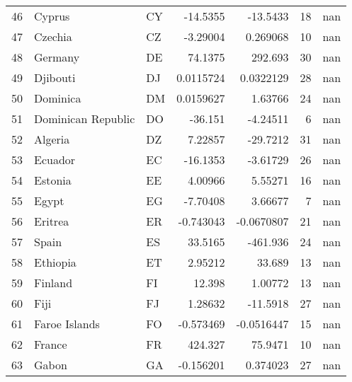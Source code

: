 \begin{tabular}{rllrrrr}
 46 & Cyprus                           & CY         &  -14.5355     &   -13.5433    &     18 &          nan \\
 47 & Czechia                          & CZ         &   -3.29004    &     0.269068  &     10 &          nan \\
 48 & Germany                          & DE         &   74.1375     &   292.693     &     30 &          nan \\
 49 & Djibouti                         & DJ         &    0.0115724  &     0.0322129 &     28 &          nan \\
 50 & Dominica                         & DM         &    0.0159627  &     1.63766   &     24 &          nan \\
 51 & Dominican Republic               & DO         &  -36.151      &    -4.24511   &      6 &          nan \\
 52 & Algeria                          & DZ         &    7.22857    &   -29.7212    &     31 &          nan \\
 53 & Ecuador                          & EC         &  -16.1353     &    -3.61729   &     26 &          nan \\
 54 & Estonia                          & EE         &    4.00966    &     5.55271   &     16 &          nan \\
 55 & Egypt                            & EG         &   -7.70408    &     3.66677   &      7 &          nan \\
 56 & Eritrea                          & ER         &   -0.743043   &    -0.0670807 &     21 &          nan \\
 57 & Spain                            & ES         &   33.5165     &  -461.936     &     24 &          nan \\
 58 & Ethiopia                         & ET         &    2.95212    &    33.689     &     13 &          nan \\
 59 & Finland                          & FI         &   12.398      &     1.00772   &     13 &          nan \\
 60 & Fiji                             & FJ         &    1.28632    &   -11.5918    &     27 &          nan \\
 61 & Faroe Islands                    & FO         &   -0.573469   &    -0.0516447 &     15 &          nan \\
 62 & France                           & FR         &  424.327      &    75.9471    &     10 &          nan \\
 63 & Gabon                            & GA         &   -0.156201   &     0.374023  &     27 &          nan \\

\end{tabular}
